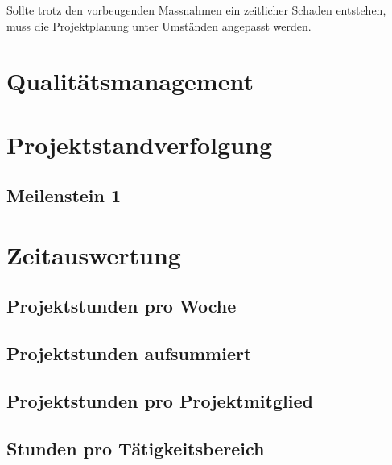 Sollte trotz den vorbeugenden Massnahmen ein zeitlicher Schaden
entstehen, muss die Projektplanung unter Umständen angepasst werden.

\section{Qualitätsmanagement}


\section{Projektstandverfolgung}

\subsection{Meilenstein 1}

\section{Zeitauswertung}

\subsection{Projektstunden pro Woche}

\subsection{Projektstunden aufsummiert}

\subsection{Projektstunden pro Projektmitglied}

\subsection{Stunden pro Tätigkeitsbereich}
